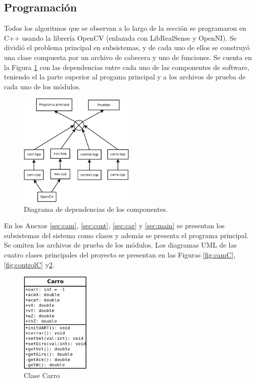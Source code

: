 \subsection{Programación}
Todos los algoritmos que se observan a lo largo de la sección se programaron en C++ usando la librería OpenCV (enlazada con LibRealSense y OpenNI). Se dividió el problema principal en subsistemas, y de cada uno de ellos se construyó una clase compuesta por un archivo de cabecera y uno de funciones. Se cuenta en la Figura \ref{fig:dep} con las dependencias entre cada uno de las componentes de software, teniendo el la parte superior al progama principal y a los archivos de prueba de cada uno de los módulos.
\begin{figure}[htbp!]
	\centering
	\includegraphics[width=0.5\textwidth]{./Figuras/Dependencias}
	\caption{Diagrama de dependencias de los componentes.}
	\label{fig:dep}
\end{figure}
\par En los Anexos \ref{sec:cam}, \ref{sec:cont}, \ref{sec:car} y \ref{sec:main} se presentan los subsistemas del sistema como clases y además se presenta el programa principal. Se omiten los archivos de prueba de los módulos. Los diagramas UML de las cuatro clases principales del proyecto se presentan en las Figuras \ref{fig:camC}, \ref{fig:controlC} y\ref{fig:carroC}.
\begin{figure}[htbp!]
	\centering
	\includegraphics[width=0.3\textwidth]{./Figuras/carroClass}
	\caption{Clase Carro}
	\label{fig:carroC}
\end{figure}
